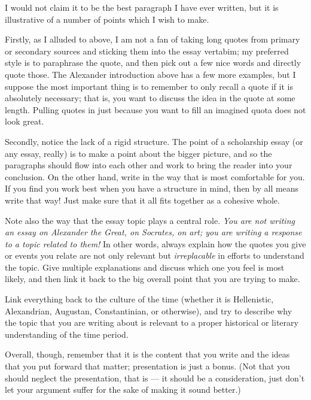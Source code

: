 \documentclass[a4paper,10pt]{article}
\begin{document}
I would not claim it to be the best paragraph I have ever written, but it is illustrative of a number of points which I wish
to make.

Firstly, as I alluded to above, I am not a fan of taking long quotes from primary or secondary sources and sticking them into
the essay vertabim; my preferred style is to paraphrase the quote, and then pick out a few nice words and directly quote those.
The Alexander introduction above has a few more examples, but I suppose the most important thing is to remember to only recall
a quote if it is absolutely necessary; that is, you want to discuss the idea in the quote at some length. Pulling quotes in just
because you want to fill an imagined quota does not look great.

Secondly, notice the lack of a rigid structure. The point of a scholarship essay (or any essay, really) is to make a point about
the bigger picture, and so the paragraphs should flow into each other and work to bring the reader into your conclusion. On
the other hand, write in the way that is most comfortable for you. If you find you work best when you have a structure in mind,
then by all means write that way! Just make sure that it all fits together as a cohesive whole.

Note also the way that the essay topic plays a central role. \emph{You are not writing an essay on Alexander the Great, on Socrates,
on art; you are writing a response to a topic related to them!} In other words, always explain how the quotes you give or events you
relate are not only relevant but \emph{irreplacable} in efforts to understand the topic. Give multiple explanations and discuss which
one you feel is most likely, and then link it back to the big overall point that you are trying to make.

Link everything back to the culture of the time (whether it is Hellenistic, Alexandrian, Augustan, Constantinian, or otherwise), and
try to describe why the topic that you are writing about is relevant to a proper historical or literary understanding of the time
period.

Overall, though, remember that it is the content that you write and the ideas that you put forward that matter; presentation is just
a bonus. (Not that you should neglect the presentation, that is --- it should be a consideration, just don't let your argument suffer
for the sake of making it sound better.)
\end{document}
